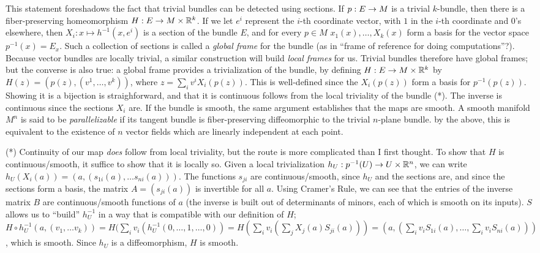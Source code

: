 This statement foreshadows the fact that
trivial bundles can be detected using sections. If $p:E\rightarrow M$ is a trivial $k$-bundle, then 
there is a fiber-preserving homeomorphism $H:E\rightarrow M\times {\Bbb R}^k$. If we let $e^i$ represent
the $i$-th coordinate vector, with $1$ in the $i$-th coordinate and $0$'s elsewhere, then 
$X_i:x\mapsto h^{-1}(x,e^i)$ is a section of the bundle $E$, and for every $p\in M$
$x_1(x),\ldots,X_k(x)$ form a basis for the vector space $p^{-1}(x)=E_x$. Such a collection
of sections is called a {\it global frame} for the bundle (as in ``frame of reference for
doing computations''?). Because vector bundles are locally trivial, a similar construction
will build {\it local frames} for us. Trivial bundles therefore have global frames; but
the converse is also true: a global frame provides a trivialization of the bundle, by
defining $H:E\rightarrow M\times {\Bbb R}^k$ by $H(z)=(p(z),(v^1,\ldots ,v^k))$, where
$z=\sum_i v^iX_i(p(z))$. This is well-defined since the $X_i(p(z))$ form a basis for
$p^{-1}(p(z))$. Showing it is a bijection is straighforward, and that it is continuous
follows from the local triviality of the bundle (*). The inverse is continuous since
the sections $X_i$ are. If the bundle is smooth, the same argument establishes that the
maps are smooth. A smooth manifold $M^n$ is said to be {\it parallelizable} if its tangent bundle is 
fiber-preserving diffeomorphic to the trivial $n$-plane bundle. by the above, this is equivalent 
to the existence of $n$ vector fields which are linearly independent at each point.

\ssk

(*) Continuity of our map {\it does} follow from local triviality, but the route is more 
complicated than I first thought. To show that $H$ is continuous/smooth, it suffice to show
that it is locally so. Given a local trivialization $h_U:p^{-1}(U)\rightarrow U\times {\Bbb R}^n$, we can 
write $h_U(X_i(a))=(a,(s_{1i}(a),\ldots s_{ni}(a)))$. The functions $s_{ji}$ are continuous/smooth,
since $h_U$ and the sections are, and since the sections form a basis, the matrix $A=(s_{ji}(a))$
is invertible for all $a$. Using Cramer's Rule, we can see that the entries of the inverse
matrix $B$ are continuous/smooth functions of $a$ (the inverse is built out of determinants of
minors, each of which is smooth on its inputs). $S$ allows us to ``build'' $h_U^{-1}$ in a way that 
is compatible with our definition of $H$; $H\circ h_U^{-1}(a,(v_1,\ldots v_k))=
H(\sum_i v_i(h_U^{-1}(0,\ldots,1,\ldots,0))=H(\sum_i v_i(\sum_j X_j(a)S_{ji}(a)))
=(a,(\sum_i v_iS_{1i}(a),\ldots ,\sum_i v_iS_{ni}(a)))$, which is smooth. Since $h_U$
is a diffeomorphism, $H$ is smooth.

